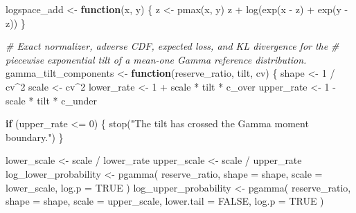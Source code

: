 \documentclass[
  10pt,
]{article}
\newenvironment{Shaded}{\begin{snugshade}}{\end{snugshade}}
\newcommand{\AttributeTok}[1]{\textcolor[rgb]{0.77,0.63,0.00}{#1}}
\newcommand{\CommentTok}[1]{\textcolor[rgb]{0.56,0.35,0.01}{\textit{#1}}}
\newcommand{\ConstantTok}[1]{\textcolor[rgb]{0.00,0.00,0.00}{#1}}
\newcommand{\ControlFlowTok}[1]{\textcolor[rgb]{0.13,0.29,0.53}{\textbf{#1}}}
\newcommand{\DecValTok}[1]{\textcolor[rgb]{0.00,0.00,0.81}{#1}}
\newcommand{\FunctionTok}[1]{\textcolor[rgb]{0.00,0.00,0.00}{#1}}
\newcommand{\NormalTok}[1]{#1}
\newcommand{\OtherTok}[1]{\textcolor[rgb]{0.56,0.35,0.01}{#1}}
\newcommand{\SpecialCharTok}[1]{\textcolor[rgb]{0.00,0.00,0.00}{#1}}
\newcommand{\StringTok}[1]{\textcolor[rgb]{0.31,0.60,0.02}{#1}}
\begin{document}
\begin{Shaded}
\begin{Highlighting}[]
\NormalTok{logspace\_add }\OtherTok{\textless{}{-}} \ControlFlowTok{function}\NormalTok{(x, y) \{}
\NormalTok{  z }\OtherTok{\textless{}{-}} \FunctionTok{pmax}\NormalTok{(x, y)}
\NormalTok{  z }\SpecialCharTok{+} \FunctionTok{log}\NormalTok{(}\FunctionTok{exp}\NormalTok{(x }\SpecialCharTok{{-}}\NormalTok{ z) }\SpecialCharTok{+} \FunctionTok{exp}\NormalTok{(y }\SpecialCharTok{{-}}\NormalTok{ z))}
\NormalTok{\}}

\CommentTok{\# Exact normalizer, adverse CDF, expected loss, and KL divergence for the}
\CommentTok{\# piecewise exponential tilt of a mean{-}one Gamma reference distribution.}
\NormalTok{gamma\_tilt\_components }\OtherTok{\textless{}{-}} \ControlFlowTok{function}\NormalTok{(reserve\_ratio, tilt, cv) \{}
\NormalTok{  shape }\OtherTok{\textless{}{-}} \DecValTok{1} \SpecialCharTok{/}\NormalTok{ cv}\SpecialCharTok{\^{}}\DecValTok{2}
\NormalTok{  scale }\OtherTok{\textless{}{-}}\NormalTok{ cv}\SpecialCharTok{\^{}}\DecValTok{2}
\NormalTok{  lower\_rate }\OtherTok{\textless{}{-}} \DecValTok{1} \SpecialCharTok{+}\NormalTok{ scale }\SpecialCharTok{*}\NormalTok{ tilt }\SpecialCharTok{*}\NormalTok{ c\_over}
\NormalTok{  upper\_rate }\OtherTok{\textless{}{-}} \DecValTok{1} \SpecialCharTok{{-}}\NormalTok{ scale }\SpecialCharTok{*}\NormalTok{ tilt }\SpecialCharTok{*}\NormalTok{ c\_under}

  \ControlFlowTok{if}\NormalTok{ (upper\_rate }\SpecialCharTok{\textless{}=} \DecValTok{0}\NormalTok{) \{}
    \FunctionTok{stop}\NormalTok{(}\StringTok{"The tilt has crossed the Gamma moment boundary."}\NormalTok{)}
\NormalTok{  \}}

\NormalTok{  lower\_scale }\OtherTok{\textless{}{-}}\NormalTok{ scale }\SpecialCharTok{/}\NormalTok{ lower\_rate}
\NormalTok{  upper\_scale }\OtherTok{\textless{}{-}}\NormalTok{ scale }\SpecialCharTok{/}\NormalTok{ upper\_rate}
\NormalTok{  log\_lower\_probability }\OtherTok{\textless{}{-}} \FunctionTok{pgamma}\NormalTok{(}
\NormalTok{    reserve\_ratio,}
    \AttributeTok{shape =}\NormalTok{ shape,}
    \AttributeTok{scale =}\NormalTok{ lower\_scale,}
    \AttributeTok{log.p =} \ConstantTok{TRUE}
\NormalTok{  )}
\NormalTok{  log\_upper\_probability }\OtherTok{\textless{}{-}} \FunctionTok{pgamma}\NormalTok{(}
\NormalTok{    reserve\_ratio,}
    \AttributeTok{shape =}\NormalTok{ shape,}
    \AttributeTok{scale =}\NormalTok{ upper\_scale,}
    \AttributeTok{lower.tail =} \ConstantTok{FALSE}\NormalTok{,}
    \AttributeTok{log.p =} \ConstantTok{TRUE}
\NormalTok{  )}


\end{Highlighting}
\end{Shaded}
\end{document}
